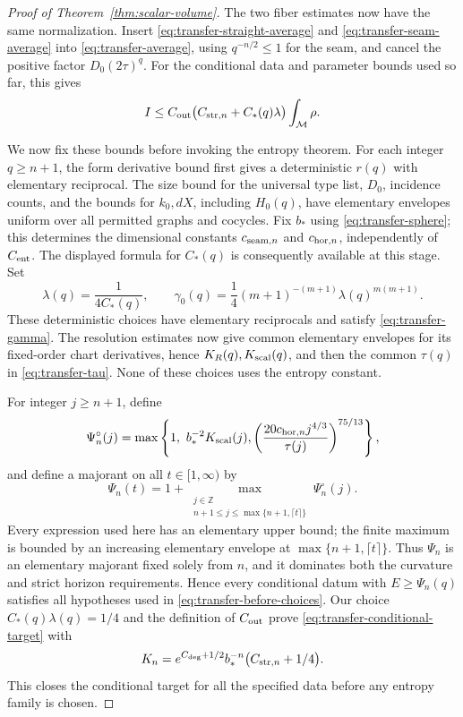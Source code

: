 \begin{proof}[Proof of Theorem~\ref{thm:scalar-volume}]
The two fiber estimates now have the same normalization.  Insert
\eqref{eq:transfer-straight-average} and
\eqref{eq:transfer-seam-average} into \eqref{eq:transfer-average},
using \(q^{-n/2}\leq1\) for the seam, and cancel the positive factor
\(D_0(2\tau)^q\).  For the conditional data and parameter bounds used
so far, this gives
\begin{equation}\label{eq:transfer-before-choices}
       I\leq C_{\rm out}\bigl(C_{{\rm str},n}+C_*(q)\lambda\bigr)
                           \int_{\mathcal M}\rho.
\end{equation}

We now fix these bounds before invoking the entropy theorem.  For each
integer \(q\geq n+1\), the form derivative bound first gives a
deterministic \(r(q)\) with elementary reciprocal.  The size bound for
the universal type list, \(D_0\), incidence counts, and the bounds for
\(k_0,dX\), including \(H_0(q)\), have elementary envelopes uniform
over all permitted graphs and cocycles.  Fix \(b_*\) using
\eqref{eq:transfer-sphere}; this determines the dimensional constants
\(c_{{\rm seam},n}\) and \(c_{{\rm hor},n}\), independently of
\(C_{\rm ent}\).  The displayed formula for \(C_*(q)\) is consequently
available at this stage.  Set
\[
 \lambda(q)=\frac1{4C_*(q)},\qquad
 \gamma_0(q)=\frac14(m+1)^{-(m+1)}\lambda(q)^{m(m+1)}.
\]
These deterministic choices have elementary reciprocals and satisfy
\eqref{eq:transfer-gamma}.  The resolution estimates now give common
elementary envelopes for its fixed-order chart derivatives, hence
\(K_R(q),K_{\rm scal}(q)\), and then the common \(\tau(q)\) in
\eqref{eq:transfer-tau}.  None of these choices uses the entropy constant.

For integer \(j\geq n+1\), define
\[
 \Psi_n^\circ(j)=\max\left\{1,\ b_*^{-2}K_{\rm scal}(j),
       \left(\frac{20c_{{\rm hor},n}j^{4/3}}{\tau(j)}\right)^{75/13}
                      \right\},
\]
and define a majorant on all \(t\in[1,\infty)\) by
\[
 \Psi_n(t)=1+\max_{\substack{j\in\mathbb Z\\
                   n+1\leq j\leq\max\{n+1,\lceil t\rceil\}}}
                            \Psi_n^\circ(j).
\]
Every expression used here has an elementary upper bound; the finite
maximum is bounded by an increasing elementary envelope at
\(\max\{n+1,\lceil t\rceil\}\).  Thus \(\Psi_n\) is an elementary
majorant fixed solely from \(n\), and it dominates both the curvature
and strict horizon requirements.  Hence every conditional datum with
\(E\geq\Psi_n(q)\) satisfies all hypotheses used in
\eqref{eq:transfer-before-choices}.  Our choice
\(C_*(q)\lambda(q)=1/4\) and the definition of \(C_{\rm out}\) prove
\eqref{eq:transfer-conditional-target} with
\[
       K_n=e^{C_{\rm deg}+1/2}b_*^{-n}
                             \bigl(C_{{\rm str},n}+1/4\bigr).
\]
This closes the conditional target for all the specified data before
any entropy family is chosen.


\end{proof}
